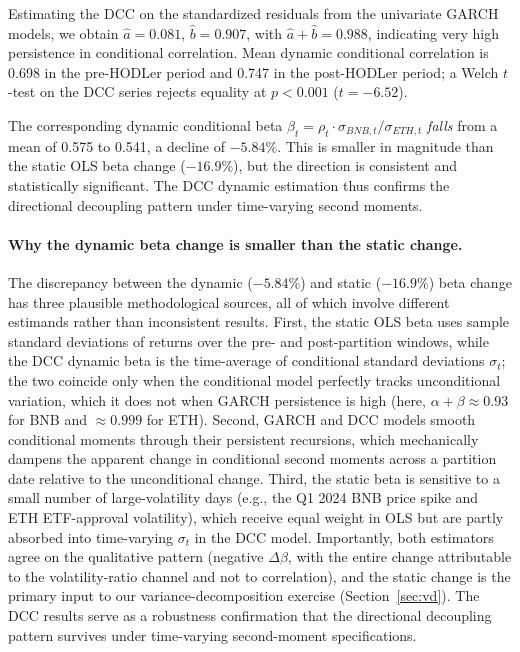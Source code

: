 \documentclass[11pt,a4paper]{article}
\begin{document}
Estimating the DCC \citep{engle2002} on the standardized residuals from the univariate GARCH models, we obtain $\hat{a} = 0.081$, $\hat{b} = 0.907$, with $\hat{a}+\hat{b}=0.988$, indicating very high persistence in conditional correlation. Mean dynamic conditional correlation is 0.698 in the pre-HODLer period and 0.747 in the post-HODLer period; a Welch $t$-test on the DCC series rejects equality at $p<0.001$ ($t=-6.52$).

The corresponding dynamic conditional beta $\beta_t = \rho_t \cdot \sigma_{BNB,t}/\sigma_{ETH,t}$ \emph{falls} from a mean of 0.575 to 0.541, a decline of $-5.84\%$. This is smaller in magnitude than the static OLS beta change ($-16.9\%$), but the direction is consistent and statistically significant. The DCC dynamic estimation thus confirms the directional decoupling pattern under time-varying second moments.

\paragraph{Why the dynamic beta change is smaller than the static change.} The discrepancy between the dynamic ($-5.84\%$) and static ($-16.9\%$) beta change has three plausible methodological sources, all of which involve different estimands rather than inconsistent results. First, the static OLS beta uses sample standard deviations of returns over the pre- and post-partition windows, while the DCC dynamic beta is the time-average of conditional standard deviations $\sigma_t$; the two coincide only when the conditional model perfectly tracks unconditional variation, which it does not when GARCH persistence is high (here, $\alpha + \beta \approx 0.93$ for BNB and $\approx 0.999$ for ETH). Second, GARCH and DCC models smooth conditional moments through their persistent recursions, which mechanically dampens the apparent change in conditional second moments across a partition date relative to the unconditional change. Third, the static beta is sensitive to a small number of large-volatility days (e.g., the Q1 2024 BNB price spike and ETH ETF-approval volatility), which receive equal weight in OLS but are partly absorbed into time-varying $\sigma_t$ in the DCC model. Importantly, both estimators agree on the qualitative pattern (negative $\Delta\beta$, with the entire change attributable to the volatility-ratio channel and not to correlation), and the static change is the primary input to our variance-decomposition exercise (Section~\ref{sec:vd}). The DCC results serve as a robustness confirmation that the directional decoupling pattern survives under time-varying second-moment specifications.
\end{document}
